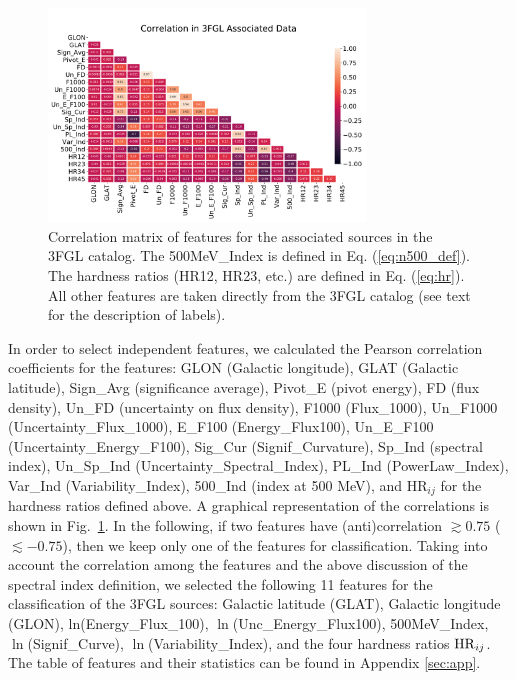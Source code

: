 \documentclass[referee]{aa} %
\begin{document}
\begin{figure}[h]
\centering
\includegraphics[width=0.75\textwidth]{plots/3fgl_assoc_cor.pdf}
\caption{Correlation matrix of features for the associated sources in the 3FGL catalog.
The 500MeV\_Index is defined in Eq. (\ref{eq:n500_def}).
The hardness ratios (HR12, HR23, etc.) are defined in Eq. (\ref{eq:hr}).
All other features are taken directly from the 3FGL catalog (see text for the description of labels).
}
\label{fig:assoc_corr_3fgli}
\end{figure}

In order to select independent features, we calculated the Pearson correlation coefficients for the features: GLON (Galactic longitude), GLAT (Galactic latitude),
Sign\_Avg (significance %
average), Pivot\_E (pivot energy), FD (flux density), Un\_FD (uncertainty on flux density), F1000 (Flux\_1000), Un\_F1000 (Uncertainty\_Flux\_1000),
E\_F100 (Energy\_Flux100),  Un\_E\_F100 (Uncertainty\_Energy\_F100), Sig\_Cur (Signif\_Curvature), Sp\_Ind (spectral index), Un\_Sp\_Ind (Uncertainty\_Spectral\_Index),
PL\_Ind (PowerLaw\_Index), Var\_Ind (Variability\_Index), 500\_Ind (index at 500 MeV), and HR$_{ij}$ for the hardness ratios defined above.
A graphical representation of the correlations is shown in Fig.~\ref{fig:assoc_corr_3fgli}. 
In the following, if two features have (anti)correlation $\gtrsim 0.75$ 
($\lesssim -0.75$), then we keep only one of the features for classification.
Taking into account the correlation among the features and the above discussion of the spectral index definition,
we selected the following 11 features for the classification of the 3FGL sources:
Galactic latitude (GLAT), Galactic longitude (GLON), ln(Energy\_Flux\_100), $\ln$(Unc\_Energy\_Flux100), 500MeV\_Index, $\ln$(Signif\_Curve), 
$\ln$(Variability\_Index), and the four hardness ratios ${\rm HR}_{ij}$.  
The table of features and their statistics can be found in Appendix \ref{sec:app}.
\end{document}
